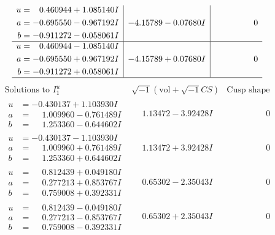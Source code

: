 \documentclass[1p]{elsarticle_modified}
\theoremstyle{definition}
\newcommand{\I}{\sqrt{-1}}
\begin{document}
$$\begin{array}{c|c|c}
\begin{aligned}
u &= \phantom{-}0.460944 + 1.085140 I \\
a &= -0.695550 - 0.967192 I \\
b &= -0.911272 - 0.058061 I\end{aligned}
 & -4.15789 - 0.07680 I & \phantom{-0.000000 } 0 \\ \hline\begin{aligned}
u &= \phantom{-}0.460944 - 1.085140 I \\
a &= -0.695550 + 0.967192 I \\
b &= -0.911272 + 0.058061 I\end{aligned}
 & -4.15789 + 0.07680 I & \phantom{-0.000000 } 0\\
 \hline 
 \end{array}$$\newpage$$\begin{array}{c|c|c}  
\text{Solutions to }I^u_{1}& \I (\text{vol} + \sqrt{-1}CS) & \text{Cusp shape}\\
 \hline 
\begin{aligned}
u &= -0.430137 + 1.103930 I \\
a &= \phantom{-}1.009960 - 0.761489 I \\
b &= \phantom{-}1.253360 - 0.644602 I\end{aligned}
 & \phantom{-}1.13472 - 3.92428 I & \phantom{-0.000000 } 0 \\ \hline\begin{aligned}
u &= -0.430137 - 1.103930 I \\
a &= \phantom{-}1.009960 + 0.761489 I \\
b &= \phantom{-}1.253360 + 0.644602 I\end{aligned}
 & \phantom{-}1.13472 + 3.92428 I & \phantom{-0.000000 } 0 \\ \hline\begin{aligned}
u &= \phantom{-}0.812439 + 0.049180 I \\
a &= \phantom{-}0.277213 + 0.853767 I \\
b &= \phantom{-}0.759008 + 0.392331 I\end{aligned}
 & \phantom{-}0.65302 - 2.35043 I & \phantom{-0.000000 } 0 \\ \hline\begin{aligned}
u &= \phantom{-}0.812439 - 0.049180 I \\
a &= \phantom{-}0.277213 - 0.853767 I \\
b &= \phantom{-}0.759008 - 0.392331 I\end{aligned}
 & \phantom{-}0.65302 + 2.35043 I & \phantom{-0.000000 } 0 \\ \hline\begin{aligned}

\end{aligned}
\end{array}$$
\end{document}
